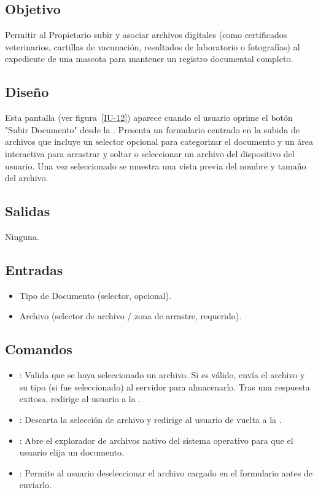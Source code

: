 \subsection{Objetivo}
    Permitir al Propietario subir y asociar archivos digitales (como certificados veterinarios, cartillas de vacunación, resultados de laboratorio o fotografías) al expediente de una mascota para mantener un registro documental completo.

\subsection{Diseño}
    Esta pantalla  (ver figura~\ref{IU-12}) aparece cuando el usuario oprime el botón "Subir Documento" desde la . Presenta un formulario centrado en la subida de archivos que incluye un selector opcional para categorizar el documento y un área interactiva para arrastrar y soltar o seleccionar un archivo del dispositivo del usuario. Una vez seleccionado se muestra una vista previa del nombre y tamaño del archivo.


\subsection{Salidas}
    Ninguna.

\subsection{Entradas}
\begin{itemize}
    \item Tipo de Documento (selector, opcional).
    \item Archivo (selector de archivo / zona de arrastre, requerido).
\end{itemize}

\subsection{Comandos}
\begin{itemize}
    \item {}: Valida que se haya seleccionado un archivo. Si es válido, envía el archivo y su tipo (si fue seleccionado) al servidor para almacenarlo. Tras una respuesta exitosa, redirige al usuario a la .
    \item {}: Descarta la selección de archivo y redirige al usuario de vuelta a la .
    \item {}: Abre el explorador de archivos nativo del sistema operativo para que el usuario elija un documento.
    \item {}: Permite al usuario deseleccionar el archivo cargado en el formulario antes de enviarlo.
\end{itemize}

